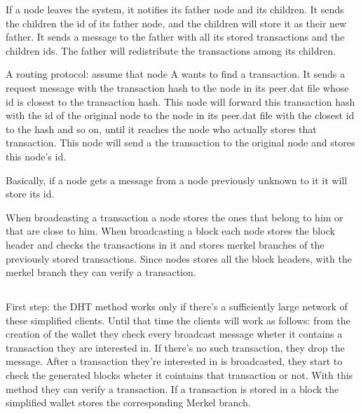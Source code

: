 \documentclass[a4paper,12pt]{article}
\begin{document}
If a node leaves the system, it notifies its father node and its children. It sends the children the id of its father node, and the children will store it as their new father. It sends a message to the father with all its stored transactions and the children ids. The father will redistribute the transactions among its children.


A routing protocol: assume that node A wants to find a transaction. It sends a request message with the transaction hash to the node in its peer.dat file whose id is closest to the transaction hash. This node will forward this transaction hash with the id of the original node to the node in its peer.dat file with the closest id to the hash and so on, until it reaches the node who actually stores that transaction. This node will send a the transaction to the original node and stores this node's id.

Basically, if a node gets a message from a node previously unknown to it it will store its id.

When broadcasting a transaction a node stores the ones that belong to him or that are close to him. When broadcasting a block each node stores the block header and checks the transactions in it and stores merkel branches of the previously stored transactions. Since nodes stores all the block headers, with the merkel branch they can verify a transaction.



\subsection{}
First step: the DHT method works only if there's a sufficiently large network of these simplified clients. Until that time the clients will work as follows: from the creation of the wallet they check every broadcast message wheter it contains a transaction they are interested in. If there's no such transaction, they drop the message. After a transaction they're interested in is broadcasted, they start to check the generated blocks wheter it cointains that transaction or not. With this method they can verify a transaction. If a transaction is stored in a block the simplified wallet stores the corresponding Merkel branch.
\end{document}
